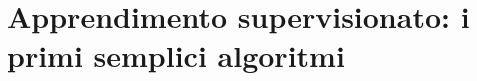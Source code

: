 

\section[Apprendimento supervisionato: i primi semplici algoritmi]{Apprendimento supervisionato: i primi semplici algoritmi}






%




